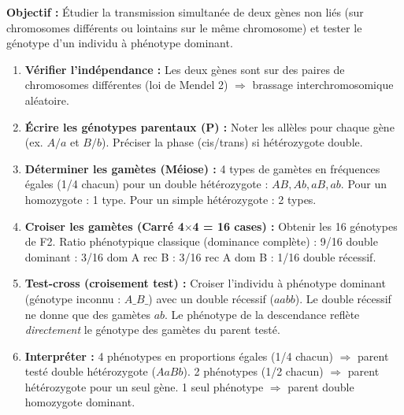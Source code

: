 \documentclass[11pt]{article}
\begin{document}
\begin{methode}
    \textbf{Objectif :} Étudier la transmission simultanée de deux gènes non liés (sur chromosomes différents ou lointains sur le même chromosome) et tester le génotype d'un individu à phénotype dominant.
    \begin{enumerate}
        \item \textbf{Vérifier l'indépendance :} Les deux gènes sont sur des paires de chromosomes différentes (loi de Mendel 2) $\Rightarrow$ brassage interchromosomique aléatoire.
        \item \textbf{Écrire les génotypes parentaux (P) :} Noter les allèles pour chaque gène (ex. $A/a$ et $B/b$). Préciser la phase (cis/trans) si hétérozygote double.
        \item \textbf{Déterminer les gamètes (Méiose) :} 4 types de gamètes en fréquences égales (1/4 chacun) pour un double hétérozygote : $AB, Ab, aB, ab$. Pour un homozygote : 1 type. Pour un simple hétérozygote : 2 types.
        \item \textbf{Croiser les gamètes (Carré 4$\times$4 = 16 cases) :} Obtenir les 16 génotypes de F2. Ratio phénotypique classique (dominance complète) : 9/16 double dominant : 3/16 dom A rec B : 3/16 rec A dom B : 1/16 double récessif.
        \item \textbf{Test-cross (croisement test) :} Croiser l'individu à phénotype dominant (génotype inconnu : $A\_ B\_$) avec un double récessif ($aa bb$). Le double récessif ne donne que des gamètes $ab$. Le phénotype de la descendance reflète \emph{directement} le génotype des gamètes du parent testé.
        \item \textbf{Interpréter :} 4 phénotypes en proportions égales (1/4 chacun) $\Rightarrow$ parent testé double hétérozygote ($Aa Bb$). 2 phénotypes (1/2 chacun) $\Rightarrow$ parent hétérozygote pour un seul gène. 1 seul phénotype $\Rightarrow$ parent double homozygote dominant.
    \end{enumerate}
\end{methode}
\end{document}
